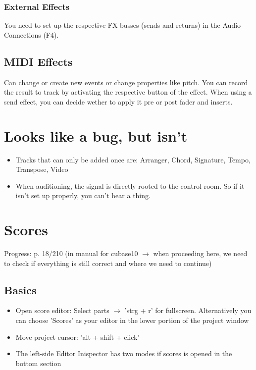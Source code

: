 \documentclass[10pt]{article}
\begin{document}
\subsubsection{External Effects} You need to set up the respective FX busses (sends and returns) in the Audio Connections (F4).

\subsection{MIDI Effects}

Can change or create new events or change properties like pitch. You can record the result to track by activating the respective button of the effect. When using a send effect, you can decide wether to apply it pre or post fader and inserts.

\section{Looks like a bug, but isn't}

\begin{itemize}
	\item Tracks that can only be added once are: Arranger, Chord, Signature, Tempo, Transpose, Video
	\item When auditioning, the signal is directly rooted to the control room. So if it isn't set up properly, you can't hear a thing.
\end{itemize}

\section{Scores}\label{Scores}

Progress: p. 18/210 (in manual for cubase10 $\rightarrow$ when proceeding here, we need to check if everything is still correct and where we need to continue)

\subsection{Basics}

\begin{itemize}
	\item Open score editor: Select parts $\rightarrow$ 'strg + r' for fullscreen. Alternatively you can choose 'Scores' as your editor in the lower portion of the project window
	\item Move project cursor: 'alt + shift + click'
	\item The left-side Editor Inispector has two modes if scores is opened in the bottom section
\end{itemize}
\end{document}
